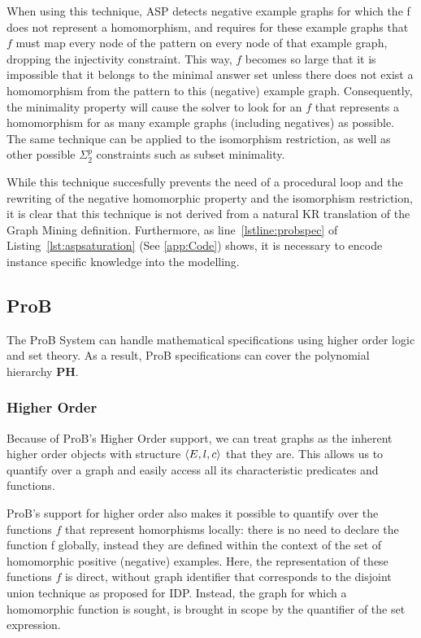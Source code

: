 When using this technique, ASP detects negative example graphs for which the f does not represent a homomorphism, and requires for these example graphs that $f$ must map every node of the pattern on every node of that example graph, dropping the injectivity constraint.
This way, $f$ becomes so large that it is impossible that it belongs to the minimal answer set unless there does not exist a homomorphism from the pattern to this (negative) example graph.
Consequently, the minimality property will cause the solver to look for an $f$ that represents a homomorphism for as many example graphs (including negatives) as possible.
The same technique can be applied to the isomorphism restriction, as well as other possible $\Sigma_{2}^{p}$ constraints such as subset minimality.


While this technique succesfully prevents the need of a procedural loop and the rewriting of the negative homomorphic property and the isomorphism restriction, it is clear that this technique is not derived from a natural KR translation of the Graph Mining definition.
Furthermore, as line~\ref{lstline:probspec} of Listing~\ref{lst:aspsaturation} (See \ref{app:Code}) shows, it is necessary to encode instance specific knowledge into the modelling.

\subsection{ProB}
The ProB System can handle mathematical specifications using higher order logic and set theory.
As a result, ProB specifications can cover the polynomial hierarchy \textbf{PH}.

\subsubsection{Higher Order}
Because of ProB's Higher Order support, we can treat graphs as the inherent higher order objects with structure $\langle E,l,c \rangle$ that they are.
This allows us to quantify over a graph and easily access all its characteristic predicates and functions.

ProB's support for higher order also makes it possible to quantify over the functions $f$ that represent homorphisms locally: there is no need to declare the function f globally, instead they are defined within the context of the set of homomorphic positive (negative) examples.
Here, the representation of these functions $f$ is direct, without graph identifier that corresponds to the disjoint union technique as proposed for IDP.
Instead, the graph  for which a homomorphic function is sought, is brought in scope by the quantifier of the set expression.

